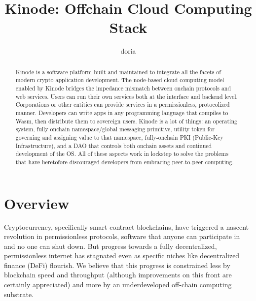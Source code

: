 \documentclass[runningheads]{llncs}
\begin{document}
%
\title{Kinode: Offchain Cloud Computing Stack}
%
%
\author{doria %
}
%
%
\institute{ }
%
\maketitle              %
%
\begin{abstract}
Kinode is a software platform built and maintained to integrate all the facets of modern crypto application development.
The node-based cloud computing model enabled by Kinode bridges the impedance mismatch between onchain protocols and web services.
Users can run their own services both at the interface and backend level.
Corporations or other entities can provide services in a permissionless, protocolized manner.
Developers can write apps in any programming language that compiles to Wasm, then distribute them to sovereign users.
Kinode is a lot of things: an operating system, fully onchain namespace/global messaging primitive, utility token for governing and assigning value to that namespace, fully-onchain PKI (Public-Key Infrastructure), and a DAO that controls both onchain assets and continued development of the OS.
All of these aspects work in lockstep to solve the problems that have heretofore discouraged developers from embracing peer-to-peer computing.

\end{abstract}
%
%
%
\tableofcontents
\newpage
%
%
%
\section{Overview}

Cryptocurrency, specifically smart contract blockchains, have triggered a nascent revolution in permissionless protocols, software that anyone can participate in and no one can shut down.
But progress towards a fully decentralized, permissionless internet has stagnated even as specific niches like decentralized finance (DeFi) flourish.
We believe that this progress is constrained less by blockchain speed and throughput (although improvements on this front are certainly appreciated) and more by an underdeveloped off-chain computing substrate.
\end{document}
